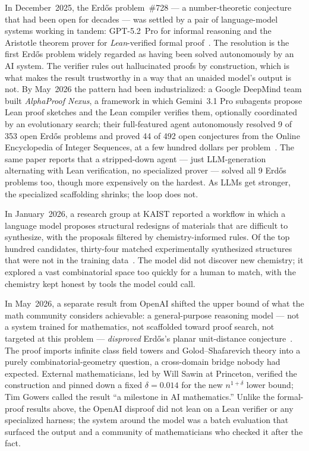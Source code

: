 In December~2025, the Erd\H{o}s problem~\#728 --- a number-theoretic
conjecture that had been open for decades --- was settled by a pair
of language-model systems working in tandem: GPT-5.2~Pro for
informal reasoning and the Aristotle theorem prover for
\emph{Lean}-verified formal proof~\citep{tao2025erdos}. The
resolution is the first Erd\H{o}s problem widely regarded as having
been solved autonomously by an AI system. The verifier rules out
hallucinated proofs by construction, which is what makes the result
trustworthy in a way that an unaided model's output is not. By
May~2026 the pattern had been industrialized: a Google DeepMind
team built \emph{AlphaProof Nexus}, a framework in which Gemini~3.1
Pro subagents propose Lean proof sketches and the Lean compiler
verifies them, optionally coordinated by an evolutionary search;
their full-featured agent autonomously resolved 9 of 353 open
Erd\H{o}s problems and proved 44 of 492 open conjectures from the
Online Encyclopedia of Integer Sequences, at a few hundred dollars
per problem~\citep{tsoukalas2026alphaproofnexus}. The same paper
reports that a stripped-down agent --- just LLM-generation
alternating with Lean verification, no specialized prover ---
solved all 9 Erd\H{o}s problems too, though more expensively on
the hardest. As LLMs get stronger, the specialized scaffolding
shrinks; the loop does not.

In January~2026, a research group at KAIST reported a workflow in
which a language model proposes structural redesigns of materials
that are difficult to synthesize, with the proposals filtered by
chemistry-informed rules. Of the top hundred candidates, thirty-four
matched experimentally synthesized structures that were not in the
training data~\citep{kaist2026materials}. The model did not discover
new chemistry; it explored a vast combinatorial space too quickly
for a human to match, with the chemistry kept honest by tools the
model could call.

In May~2026, a separate result from OpenAI shifted the upper
bound of what the math community considers achievable: a
general-purpose reasoning model --- not a system trained for
mathematics, not scaffolded toward proof search, not targeted at
this problem --- \emph{disproved} Erd\H{o}s's planar
unit-distance conjecture~\citep{openai2026discrete}. The proof
imports infinite class field towers and Golod--Shafarevich theory
into a purely combinatorial-geometry question, a cross-domain
bridge nobody had expected. External mathematicians, led by Will
Sawin at Princeton, verified the construction and pinned down a
fixed $\delta = 0.014$ for the new $n^{1+\delta}$ lower bound;
Tim Gowers called the result ``a milestone in AI mathematics.''
Unlike the formal-proof results above, the OpenAI disproof did
not lean on a Lean verifier or any specialized harness; the
system around the model was a batch evaluation that surfaced the
output and a community of mathematicians who checked it after the
fact.

